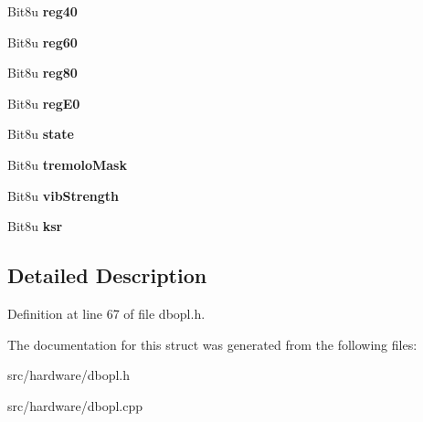 \begin{DoxyCompactItemize}
\item 
\hypertarget{structDBOPL_1_1Operator_a8f6cc392076415c349c663c085052c50}{Bit8u {\bfseries reg40}}\label{structDBOPL_1_1Operator_a8f6cc392076415c349c663c085052c50}

\item 
\hypertarget{structDBOPL_1_1Operator_a2b16c74f782a7c668c36b564ac328eb4}{Bit8u {\bfseries reg60}}\label{structDBOPL_1_1Operator_a2b16c74f782a7c668c36b564ac328eb4}

\item 
\hypertarget{structDBOPL_1_1Operator_a98238d9e6b0be684c4c8390637e7455f}{Bit8u {\bfseries reg80}}\label{structDBOPL_1_1Operator_a98238d9e6b0be684c4c8390637e7455f}

\item 
\hypertarget{structDBOPL_1_1Operator_a9eb080350f9a698ab445da8d0406b218}{Bit8u {\bfseries reg\-E0}}\label{structDBOPL_1_1Operator_a9eb080350f9a698ab445da8d0406b218}

\item 
\hypertarget{structDBOPL_1_1Operator_adbbe3dbf88283d010b74c437f719c021}{Bit8u {\bfseries state}}\label{structDBOPL_1_1Operator_adbbe3dbf88283d010b74c437f719c021}

\item 
\hypertarget{structDBOPL_1_1Operator_a0e99d5276ab4b8e0bd6c9af4817aed13}{Bit8u {\bfseries tremolo\-Mask}}\label{structDBOPL_1_1Operator_a0e99d5276ab4b8e0bd6c9af4817aed13}

\item 
\hypertarget{structDBOPL_1_1Operator_a3a4bac8b61bc9468e1b4eb5cda553d33}{Bit8u {\bfseries vib\-Strength}}\label{structDBOPL_1_1Operator_a3a4bac8b61bc9468e1b4eb5cda553d33}

\item 
\hypertarget{structDBOPL_1_1Operator_a203eb83fad8fb4e4862f3b7d5ab5f548}{Bit8u {\bfseries ksr}}\label{structDBOPL_1_1Operator_a203eb83fad8fb4e4862f3b7d5ab5f548}

\end{DoxyCompactItemize}


\subsection{Detailed Description}


Definition at line 67 of file dbopl.\-h.



The documentation for this struct was generated from the following files\-:\begin{DoxyCompactItemize}
\item 
src/hardware/dbopl.\-h\item 
src/hardware/dbopl.\-cpp\end{DoxyCompactItemize}

